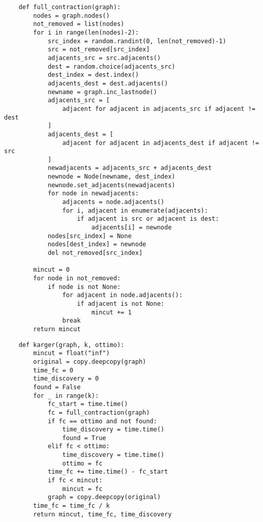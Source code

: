 \begin{verbatim}
    def full_contraction(graph):
        nodes = graph.nodes()
        not_removed = list(nodes)
        for i in range(len(nodes)-2):
            src_index = random.randint(0, len(not_removed)-1)
            src = not_removed[src_index]
            adjacents_src = src.adjacents()
            dest = random.choice(adjacents_src)
            dest_index = dest.index()
            adjacents_dest = dest.adjacents()
            newname = graph.inc_lastnode()
            adjacents_src = [
                adjacent for adjacent in adjacents_src if adjacent != dest
            ]
            adjacents_dest = [
                adjacent for adjacent in adjacents_dest if adjacent != src
            ]
            newadjacents = adjacents_src + adjacents_dest
            newnode = Node(newname, dest_index)
            newnode.set_adjacents(newadjacents)
            for node in newadjacents:
                adjacents = node.adjacents()
                for i, adjacent in enumerate(adjacents):
                    if adjacent is src or adjacent is dest:
                        adjacents[i] = newnode
            nodes[src_index] = None
            nodes[dest_index] = newnode
            del not_removed[src_index]

        mincut = 0
        for node in not_removed:
            if node is not None:
                for adjacent in node.adjacents():
                    if adjacent is not None:
                        mincut += 1
                break
        return mincut
\end{verbatim}        

\clearpage

\begin{verbatim}
    def karger(graph, k, ottimo):
        mincut = float("inf")
        original = copy.deepcopy(graph)
        time_fc = 0
        time_discovery = 0
        found = False
        for _ in range(k):
            fc_start = time.time()
            fc = full_contraction(graph)
            if fc == ottimo and not found:
                time_discovery = time.time()
                found = True
            elif fc < ottimo:
                time_discovery = time.time()
                ottimo = fc
            time_fc += time.time() - fc_start
            if fc < mincut:
                mincut = fc
            graph = copy.deepcopy(original)
        time_fc = time_fc / k
        return mincut, time_fc, time_discovery

\end{verbatim}

